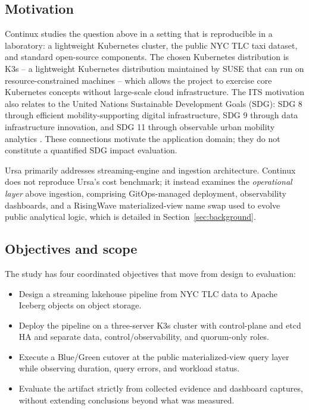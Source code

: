 \subsection{Motivation}
Continux studies the question above in a setting that is reproducible in a laboratory: a lightweight Kubernetes cluster, the public NYC TLC taxi dataset, and standard open-source components. The chosen Kubernetes distribution is K3s -- a lightweight Kubernetes distribution maintained by SUSE that can run on resource-constrained machines -- which allows the project to exercise core Kubernetes concepts without large-scale cloud infrastructure. The ITS motivation also relates to the United Nations Sustainable Development Goals (SDG): SDG 8 through efficient mobility-supporting digital infrastructure, SDG 9 through data infrastructure innovation, and SDG 11 through observable urban mobility analytics \parencite{sdg8,sdg9,sdg11}. These connections motivate the application domain; they do not constitute a quantified SDG impact evaluation.

Ursa primarily addresses streaming-engine and ingestion architecture. Continux does not reproduce Ursa's cost benchmark; it instead examines the \emph{operational layer} above ingestion, comprising GitOps-managed deployment, observability dashboards, and a RisingWave materialized-view name swap used to evolve public analytical logic, which is detailed in Section~\ref{sec:background}.

\subsection{Objectives and scope}
The study has four coordinated objectives that move from design to evaluation:

\begin{itemize}
\item Design a streaming lakehouse pipeline from NYC TLC data to Apache Iceberg objects on object storage.
\item Deploy the pipeline on a three-server K3s cluster with control-plane and etcd HA and separate data, control/observability, and quorum-only roles.
\item Execute a Blue/Green cutover at the public materialized-view query layer while observing duration, query errors, and workload status.
\item Evaluate the artifact strictly from collected evidence and dashboard captures, without extending conclusions beyond what was measured.
\end{itemize}

